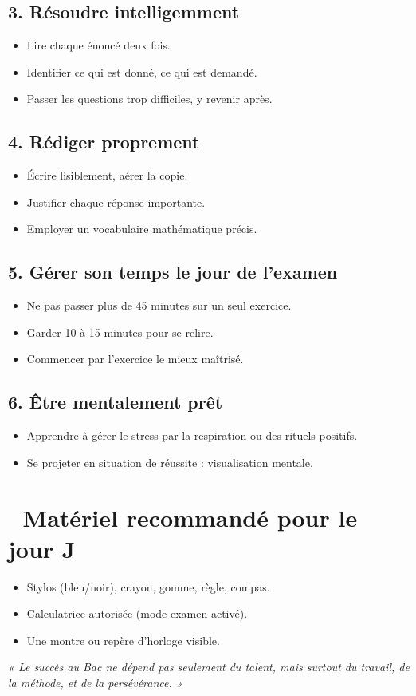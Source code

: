 \subsection*{3. Résoudre intelligemment}
\begin{itemize}[label=--]
    \item Lire chaque énoncé deux fois.
    \item Identifier ce qui est donné, ce qui est demandé.
    \item Passer les questions trop difficiles, y revenir après.
\end{itemize}

\subsection*{4. Rédiger proprement}
\begin{itemize}[label=--]
    \item Écrire lisiblement, aérer la copie.
    \item Justifier chaque réponse importante.
    \item Employer un vocabulaire mathématique précis.
\end{itemize}

\subsection*{5. Gérer son temps le jour de l’examen}
\begin{itemize}[label=--]
    \item Ne pas passer plus de 45 minutes sur un seul exercice.
    \item Garder 10 à 15 minutes pour se relire.
    \item Commencer par l’exercice le mieux maîtrisé.
\end{itemize}

\subsection*{6. Être mentalement prêt}
\begin{itemize}[label=--]
    \item Apprendre à gérer le stress par la respiration ou des rituels positifs.
    \item Se projeter en situation de réussite : visualisation mentale.
\end{itemize}

\section*{📌 Matériel recommandé pour le jour J}
\begin{itemize}[label=--]
    \item Stylos (bleu/noir), crayon, gomme, règle, compas.
    \item Calculatrice autorisée (mode examen activé).
    \item Une montre ou repère d’horloge visible.
\end{itemize}

\vspace{2em}
\begin{center}
    \textit{« Le succès au Bac ne dépend pas seulement du talent, mais surtout du travail, de la méthode, et de la persévérance. »}
\end{center}



